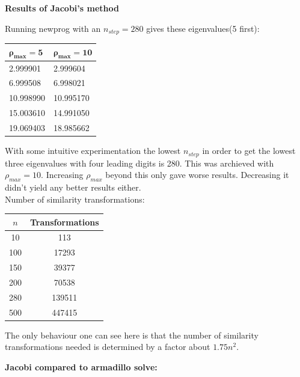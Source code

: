 \documentclass[11pt, a4 paper]{report}
\newenvironment{tabbed}{\begin{addmargin}{0.1cm}}{\end{addmargin}}
\newcommand{\sectiontitle}[1]{\begin{center} \Large\textbf{{#1}} \end{center}}
\newcommand{\sectionundertitle}[1]{\hspace{-0.5cm} \textbf{{#1}}}
\newcommand{\vsp}{\vspace{0.2cm}}
\begin{document}
\sectiontitle{Results of Jacobi's method}
    \begin{tabbed}
        Running new\textunderscore prog with an $n_{step}=280$ gives these eigenvalues(5 first):\\
        \begin{center}
        \begin{tabular}{l|l}
            $\boldsymbol{\rho_{max}=5}$ & $\boldsymbol{\rho_{max}=10}$\\ \hline
            2.999901 & 2.999604\\
            6.999508 & 6.998021\\
            10.998990 & 10.995170\\
            15.003610 & 14.991050\\ 
            19.069403 & 18.985662\\ 
        \end{tabular}
        \end{center}\vsp
        With some intuitive experimentation the lowest $n_{step}$ in order to get the lowest three eigenvalues with four leading digits is 280. This was archieved with $\rho_{max}=10$. Increasing $\rho_{max}$ beyond this only gave worse results. Decreasing it didn't yield any better results either.\vsp\\
        Number of similarity transformations:\\
        \begin{center}
            \begin{tabular}{c|c}
                $n$ & Transformations\\ \hline
                10 & 113\\
                100 & 17293\\
                150 & 39377\\
                200 & 70538\\
                280 & 139511\\
                500 & 447415 
            \end{tabular}
        \end{center}
        The only behaviour one can see here is that the number of similarity transformations needed is determined by a factor about $1.75n^2$. 
    \end{tabbed}\vsp
\newpage
    \sectionundertitle{Jacobi compared to armadillo solve:} \vsp
\end{document}
